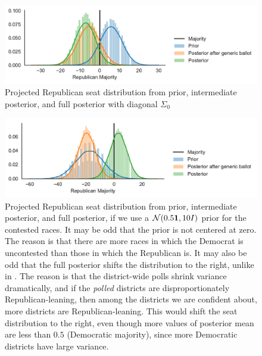 \documentclass[11pt]{article}
\begin{document}
\begin{figure}[tbh]
  \centering
  \includegraphics[width=\textwidth]{rep_seats_with_diagonal_prior.pdf}
  \caption{Projected Republican seat distribution from prior, intermediate
  posterior, and full posterior with diagonal $\Sigma_0$}
  \label{fig:diagonal_prior}
\end{figure}

\begin{figure}[tbh]
  \centering
  \includegraphics[width=\textwidth]{rep_seats_with_diffused_prior.pdf}
  \caption{Projected Republican seat distribution from prior, intermediate posterior, and full posterior, if we use a $\mathcal{N}(0.5\bm{1}, 10I)$ prior for the contested races. It may be odd that the prior is not centered at zero. The reason is that there are more races in which the Democrat is uncontested than those in which the Republican is. It may also be odd that the full posterior shifts the distribution to the right, unlike in . The reason is that the district-wide polls shrink variance dramatically, and if the \emph{polled} districts are disproportionately Republican-leaning, then among the districts we are confident about, more districts are Republican-leaning. This would shift the seat distribution to the right, even though more values of posterior mean are less than $0.5$ (Democratic majority), since more Democratic districts have large variance.}
  \label{fig:hists_diffuse}
\end{figure}
\end{document}
